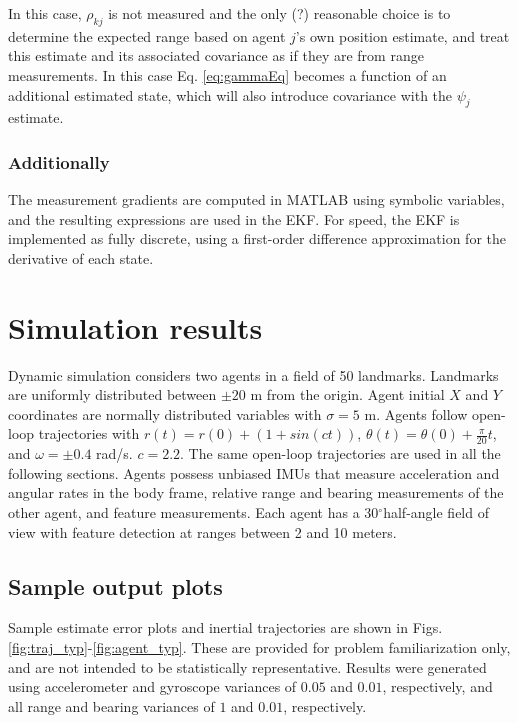 \documentclass{aiaa-tc}
\newcommand{\degree}{\ensuremath{^\circ}}
\begin{document}
In this case, $\rho_{kj}$ is not measured and the only (?) reasonable choice is to determine the expected range based on agent $j$'s own position estimate, and treat this estimate and its associated covariance as if they are from range measurements. In this case Eq. \ref{eq:gammaEq} becomes a function of an additional estimated state, which will also introduce covariance with the $\psi_j$ estimate.

\subsubsection{Additionally}

The measurement gradients are computed in MATLAB using symbolic variables, and the resulting expressions are used in the EKF. For speed, the EKF is implemented as fully discrete, using a first-order difference approximation for the derivative of each state.

\section{Simulation results}

Dynamic simulation considers two agents in a field of 50 landmarks. Landmarks are uniformly distributed between $\pm 20$ m from the origin. Agent initial $X$ and $Y $ coordinates are normally distributed variables with $\sigma = 5$ m. Agents follow open-loop trajectories with $r(t) = r(0)+(1+sin(ct))$, $\theta(t) = \theta(0) + \frac{\pi}{20}t$, and $\omega = \pm 0.4$ rad/s. $c = 2.2$. The same open-loop trajectories are used in all the following sections. Agents possess unbiased IMUs that measure acceleration and angular rates in the body frame, relative range and bearing measurements of the other agent, and feature measurements. Each agent has a 30\degree half-angle field of view with feature detection at ranges between 2 and 10 meters.

\subsection{Sample output plots}

Sample estimate error plots and inertial trajectories are shown in Figs. \ref{fig:traj_typ}-\ref{fig:agent_typ}. These are provided for problem familiarization only, and are not intended to be statistically representative. Results were generated using accelerometer and gyroscope variances of $0.05$ and $0.01$, respectively, and all range and bearing variances of $1$ and $0.01$, respectively.
\end{document}
